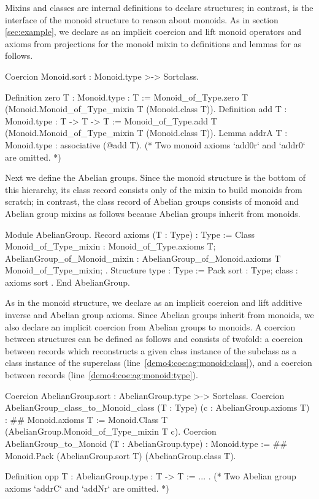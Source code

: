 \documentclass[a4paper,UKenglish,cleveref, autoref]{lipics-v2019}
\newcommand{\mixin}{mixin}
\newcommand{\mixins}{mixins}
\theoremstyle{implem}
\theoremstyle{implem}
\theoremstyle{command}
\begin{document}
Mixins and classes are internal definitions to declare structures; in contrast,  is the interface of the monoid structure to reason about monoids.
As in section \ref{sec:example}, we declare  as an implicit coercion and lift monoid operators and axioms from projections for the monoid \mixin{} to definitions and lemmas for  as follows.
\begin{coqcode}
Coercion Monoid.sort : Monoid.type >-> Sortclass.

Definition zero {T : Monoid.type} : T :=
  Monoid_of_Type.zero T (Monoid.Monoid_of_Type_mixin T (Monoid.class T)).
Definition add {T : Monoid.type} : T -> T -> T :=
  Monoid_of_Type.add T (Monoid.Monoid_of_Type_mixin T (Monoid.class T)).
Lemma addrA {T : Monoid.type} : associative (@add T).
(* Two monoid axioms `add0r` and `addr0` are omitted. *)
\end{coqcode}

Next we define the Abelian groups.
Since the monoid structure is the bottom of this hierarchy, its class record  consists only of the \mixin{} to build monoids from scratch; in contrast, the class record of Abelian groups consists of monoid and Abelian group \mixins{} as follows because Abelian groups inherit from monoids.
\begin{coqcode}
Module AbelianGroup.
Record axioms (T : Type) : Type := Class {
  Monoid_of_Type_mixin : Monoid_of_Type.axioms T;
  AbelianGroup_of_Monoid_mixin : AbelianGroup_of_Monoid.axioms T Monoid_of_Type_mixin; }.
Structure type : Type := Pack { sort : Type; class : axioms sort }.
End AbelianGroup.
\end{coqcode}
As in the monoid structure, we declare  as an implicit coercion and lift additive inverse  and Abelian group axioms.
Since Abelian groups inherit from monoids, we also declare an implicit coercion from Abelian groups to monoids.
A coercion between structures can be defined as follows and consists of twofold: a coercion between  records which reconstructs a given class instance of the subclass as a class instance of the superclass (line~\ref{demo4:coe:ag:monoid:class}), and a coercion between  records (line~\ref{demo4:coe:ag:monoid:type}).
\begin{coqcode}
Coercion AbelianGroup.sort : AbelianGroup.type >-> Sortclass.
Coercion AbelianGroup_class_to_Monoid_class (T : Type) (c : AbelianGroup.axioms T) : #\label{demo4:coe:ag:monoid:class}#
  Monoid.axioms T := Monoid.Class T (AbelianGroup.Monoid_of_Type_mixin T c).
Coercion AbelianGroup_to_Monoid (T : AbelianGroup.type) : Monoid.type := #\label{demo4:coe:ag:monoid:type}#
  Monoid.Pack (AbelianGroup.sort T) (AbelianGroup.class T).

Definition opp {T : AbelianGroup.type} : T -> T := ... .
(* Two Abelian group axioms `addrC` and `addNr` are omitted. *)
\end{coqcode}
\end{document}
